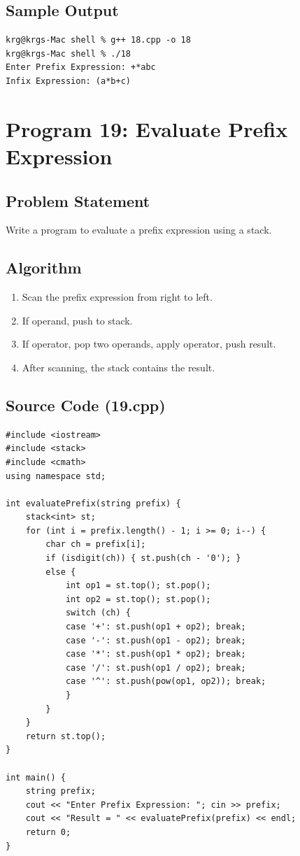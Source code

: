 \documentclass[a4paper,12pt]{article}
\begin{document}
\subsection*{Sample Output}
\begin{lstlisting}[style=outputstyle]
krg@krgs-Mac shell % g++ 18.cpp -o 18
krg@krgs-Mac shell % ./18
Enter Prefix Expression: +*abc
Infix Expression: (a*b+c)
\end{lstlisting}

\newpage

\section*{Program 19: Evaluate Prefix Expression}

\subsection*{Problem Statement}
Write a program to evaluate a prefix expression using a stack.

\subsection*{Algorithm}
\begin{enumerate}
    \item Scan the prefix expression from right to left.
    \item If operand, push to stack.
    \item If operator, pop two operands, apply operator, push result.
    \item After scanning, the stack contains the result.
\end{enumerate}

\subsection*{Source Code (19.cpp)}
\begin{lstlisting}[style=cppstyle]
#include <iostream>
#include <stack>
#include <cmath>
using namespace std;

int evaluatePrefix(string prefix) {
    stack<int> st;
    for (int i = prefix.length() - 1; i >= 0; i--) {
        char ch = prefix[i];
        if (isdigit(ch)) { st.push(ch - '0'); }
        else {
            int op1 = st.top(); st.pop();
            int op2 = st.top(); st.pop();
            switch (ch) {
            case '+': st.push(op1 + op2); break;
            case '-': st.push(op1 - op2); break;
            case '*': st.push(op1 * op2); break;
            case '/': st.push(op1 / op2); break;
            case '^': st.push(pow(op1, op2)); break;
            }
        }
    }
    return st.top();
}

int main() {
    string prefix;
    cout << "Enter Prefix Expression: "; cin >> prefix;
    cout << "Result = " << evaluatePrefix(prefix) << endl;
    return 0;
}
\end{lstlisting}
\end{document}
